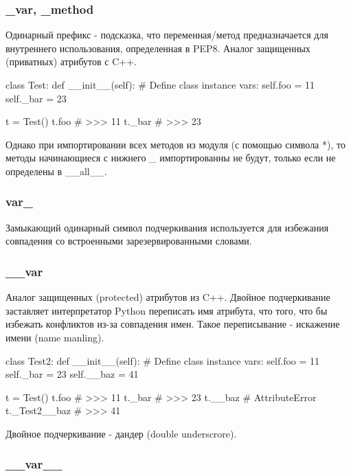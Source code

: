 \subsubsection{\_var, \_method}

Одинарный префикс - подсказка, что переменная/метод предназначается для внутреннего использования, определенная в PEP8. Аналог защищенных (приватных) атрибутов с C++.

\begin{python}
class Test:
    def __init__(self):
        # Define class instance vars:
        self.foo = 11 
        self._bar = 23

t = Test()
t.foo
# >>> 11
t._bar
# >>> 23
\end{python}

Однако при импортировании всех методов из модуля (с помощью символа *), то методы начинающиеся с нижнего \_ импортированны не будут, только если не определены в \_\_all\_\_.

\subsubsection{var\_}

Замыкающий одинарный символ подчеркивания используется для избежания совпадения со встроенными зарезервированными словами.

\subsubsection{\_\_var}

Аналог защищенных (protected) атрибутов из C++. Двойное подчеркивание заставляет интерпретатор Python переписать имя атрибута, что того, что бы избежать конфликтов из-за совпадения имен. Такое переписывание - искажение имени (name manling).

\begin{python}
class Test2:
    def __init__(self):
        # Define class instance vars:
        self.foo = 11 
        self._bar = 23
        self.__baz = 41

t = Test()
t.foo
# >>> 11
t._bar
# >>> 23
t.__baz
# AttributeError
t._Test2__baz
# >>> 41
\end{python}

Двойное подчеркивание - дандер (double underscrore).

\subsubsection{\_\_var\_\_}

